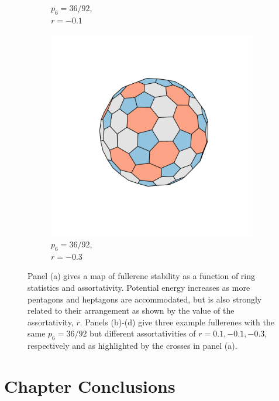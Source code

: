 \begin{figure}[bt]
\begin{subfigure}[b]{0.2\textwidth}
         \caption{$p_6=36/92$,\\ $r=-0.1$}
         \label{fig:fullerene92b}
     \end{subfigure}
     \hfill
     \begin{subfigure}[b]{0.2\textwidth}
         \centering
         \includegraphics[width=\textwidth]{./figures/general_networks/full92_r-30.pdf}
         \caption{$p_6=36/92$,\\ $r=-0.3$}
         \label{fig:fullerene92c}
     \end{subfigure}
     \hfill
     
     \caption{Panel (a) gives a map of fullerene stability as a function of ring statistics and assortativity.
        Potential energy increases as more pentagons and heptagons are accommodated, but is also strongly related to their arrangement as shown by the value of the assortativity, $r$.
        Panels (b)-(d) give three example fullerenes with the same $p_6=36/92$ but different assortativities of $r=0.1,-0.1,-0.3$, respectively and as highlighted by the crosses in panel (a).}
     \label{fig:fullerene92}
\end{figure}

\section{Chapter Conclusions}

